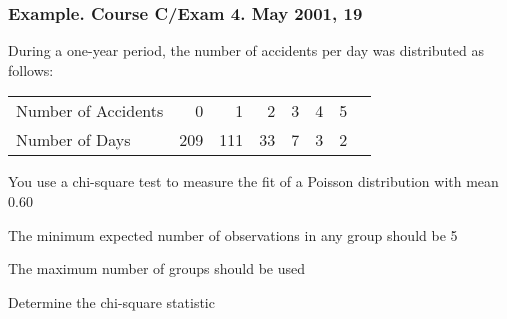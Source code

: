 \documentclass{beamer}
\begin{document}
\begin{frame}[shrink=2]%
\frametitle{Example. Course C/Exam 4. May 2001, 19}

During a one-year period, the number of accidents per day was
distributed as follows: \vspace{2mm}

\begin{tabular}{l|rrrrrrr}\hline
Number of Accidents &          0 &          1 &          2 &          3 &          4 &      5      \\
Number of Days &        209 &        111 &         33 &          7 &
3 &          2
\\ \hline
\end{tabular}

\vspace{2mm}

You use a chi-square test to measure the fit of a Poisson
distribution with mean 0.60 \vspace{2mm}

The minimum expected number of observations in any group should be 5
\vspace{2mm}

The maximum number of groups should be used

\vspace{2mm}

Determine the chi-square statistic
\end{frame}

 
\end{document}
